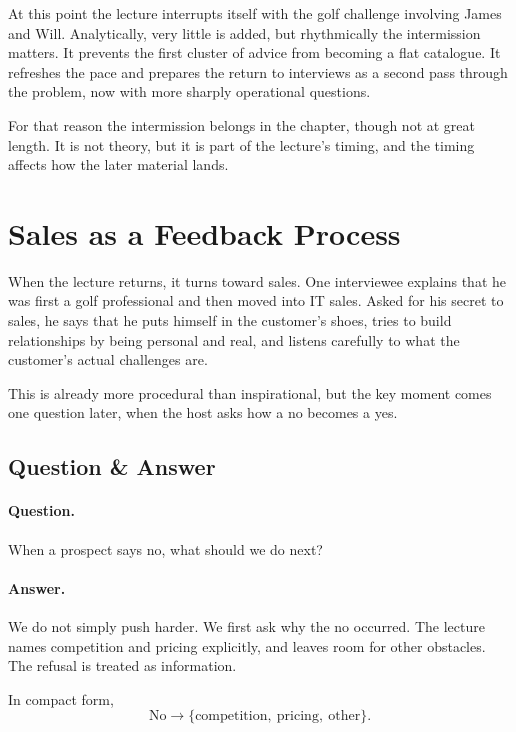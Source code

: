 At this point the lecture interrupts itself with the golf challenge involving James and Will. Analytically, very little is added, but rhythmically the intermission matters. It prevents the first cluster of advice from becoming a flat catalogue. It refreshes the pace and prepares the return to interviews as a second pass through the problem, now with more sharply operational questions.

For that reason the intermission belongs in the chapter, though not at great length. It is not theory, but it is part of the lecture's timing, and the timing affects how the later material lands.

\section{Sales as a Feedback Process}

When the lecture returns, it turns toward sales. One interviewee explains that he was first a golf professional and then moved into IT sales. Asked for his secret to sales, he says that he puts himself in the customer's shoes, tries to build relationships by being personal and real, and listens carefully to what the customer's actual challenges are.

This is already more procedural than inspirational, but the key moment comes one question later, when the host asks how a no becomes a yes.

\subsection{Question \& Answer}

\paragraph{Question.} When a prospect says no, what should we do next?

\paragraph{Answer.} We do not simply push harder. We first ask why the no occurred. The lecture names competition and pricing explicitly, and leaves room for other obstacles. The refusal is treated as information.

In compact form,
\begin{equation}
\text{No} \longrightarrow \{\text{competition},\ \text{pricing},\ \text{other}\}.
\end{equation}

